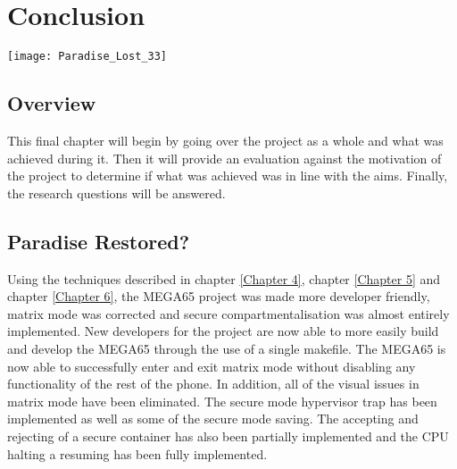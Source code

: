 
\chapter{Conclusion} %

\texttt{[image: Paradise\_Lost\_33]}

\label{Chapter 8} %

\section{Overview}

This final chapter will begin by going over the project as a whole and what was achieved during it. Then it will provide an evaluation against the motivation of the project to determine if what was achieved was in line with the aims. Finally, the research questions will be answered.


\section{Paradise Restored?}

\label{Ch8 Sec1}

Using the techniques described in chapter \ref{Chapter 4}, chapter \ref{Chapter 5} and chapter \ref{Chapter 6}, the MEGA65 project was made more developer friendly, matrix mode was corrected and secure compartmentalisation was almost entirely implemented. New developers for the project are now able to more easily build and develop the MEGA65 through the use of a single makefile. The MEGA65 is now able to successfully enter and exit matrix mode without disabling any functionality of the rest of the phone. In addition, all of the visual issues in matrix mode have been eliminated. The secure mode hypervisor trap has been implemented as well as some of the secure mode saving. The accepting and rejecting of a secure container has also been partially implemented and the CPU halting a resuming has been fully implemented.\\

